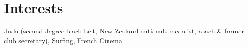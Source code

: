 \documentclass[letterpaper,11pt]{article}
\begin{document}
\section{Interests}
{\small Judo (second degree black belt, New Zealand nationals medalist, coach \& former club secretary)}, {\small Surfing}, {\small French Cinema}
\end{document}
